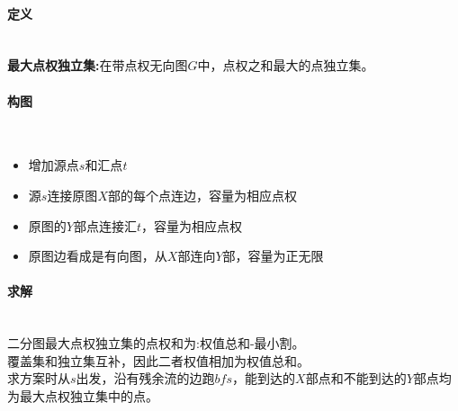 \paragraph{定义}~{}
\\
\textbf{最大点权独立集:}在带点权无向图$G$中，点权之和最大的点独立集。

\paragraph{构图}~{}
\\
\begin{itemize}
\item 增加源点$s$和汇点$t$
\item 源$s$连接原图$X$部的每个点连边，容量为相应点权
\item 原图的$Y$部点连接汇$t$，容量为相应点权
\item 原图边看成是有向图，从$X$部连向$Y$部，容量为正无限
\end{itemize}

\paragraph{求解}~{}
\\
二分图最大点权独立集的点权和为:权值总和-最小割。\\
覆盖集和独立集互补，因此二者权值相加为权值总和。\\
求方案时从$s$出发，沿有残余流的边跑$bfs$，能到达的$X$部点和不能到达的$Y$部点均为最大点权独立集中的点。